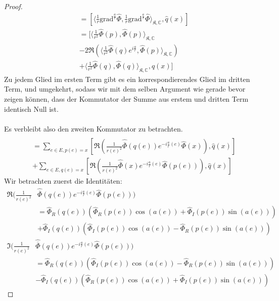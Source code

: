 \documentclass[11pt,a4paper,leqno]{report}
\numberwithin{equation}{chapter}
\begin{document}
\begin{proof}
\begin{align*}
		[\langle \hat{\Phi}, \Delta^{a}_r\hat{\Phi}\rangle_{\mathfrak{E},\mathbb{C}},\hat{q}(x)]&=
		[\langle \frac{1}{r}\text{grad}^{\frac{a}{r}}\hat{\Phi}, \frac{1}{r}\text{grad}^{\frac{a}{r}}\hat{\Phi}\rangle_{\mathfrak{K},\mathbb{C}},\hat{q}(x)]\\&=
		[\langle \frac{1}{r^2} \hat{\Phi}(p), \hat{\Phi}(p)\rangle_{\mathfrak{K},\mathbb{C}} \\&- 2\Re(\langle \frac{1}{r^2}\hat{\Phi}(q)e^{i\frac{a}{r}},\hat{\Phi}(p) \rangle_{\mathfrak{K},\mathbb{C}}) \\&+ \langle \frac{1}{r^2} \hat{\Phi}(q), \hat{\Phi}(q) \rangle_{\mathfrak{K},\mathbb{C}},\hat{q}(x)]
	\end{align*}
	Zu jedem Glied im ersten Term gibt es ein korrespondierendes Glied im dritten Term, und umgekehrt, sodass wir mit dem selben Argument wie gerade bevor zeigen k\"onnen, dass der Kommutator der Summe aus erstem und dritten Term identisch Null ist.\\
	\\
	Es verbleibt also den zweiten Kommutator zu betrachten.
	\begin{align*}
		[\Re(\langle \frac{1}{r^2}\hat{\Phi}(q)e^{i\frac{a}{r}},&\hat{\Phi}(p) \rangle_{\mathfrak{K},\mathbb{C}}) ,\hat{q}(x)]\\&=
		\sum_{e\in E, p(e)=x}[\Re(\frac{1}{r(e)^2}\hat{\overline{\Phi}}(q(e))e^{-i\frac{a}{r}(e)}\hat{\Phi}(x)) ,\hat{q}(x)]\\&+
			\sum_{e\in E, q(e)=x}[\Re(\frac{1}{r(e)^2}\hat{\overline{\Phi}}(x)e^{-i\frac{a}{r}(e)}\hat{\Phi}(p(e))) ,\hat{q}(x)]	
		\end{align*}
	Wir betrachten zuerst die Identit\"aten:
	\begin{align*}
		\Re(\frac{1}{r(e)^2}&\hat{\overline{\Phi}}(q(e))e^{-i\frac{a}{r}(e)}\hat{\Phi}(p(e)))\\
		&=\hat{\Phi}_R(q(e))(\hat{\Phi}_R(p(e))\cos(a(e)) + \hat{\Phi}_I(p(e))\sin(a(e)))\\
		&+\hat{\Phi}_I(q(e))(\hat{\Phi}_I(p(e))\cos(a(e)) - \hat{\Phi}_R(p(e))\sin(a(e)))
	\end{align*}
	\begin{align*}
		\Im(\frac{1}{r(e)^2}&\hat{\overline{\Phi}}(q(e))e^{-i\frac{a}{r}(e)}\hat{\Phi}(p(e)))\\
		&=\hat{\Phi}_R(q(e))(\hat{\Phi}_I(p(e))\cos(a(e)) - \hat{\Phi}_R(p(e))\sin(a(e)))\\
		&-\hat{\Phi}_I(q(e))(\hat{\Phi}_R(p(e))\cos(a(e)) + \hat{\Phi}_I(p(e))\sin(a(e)))
	\end{align*}

\end{proof}
\end{document}
